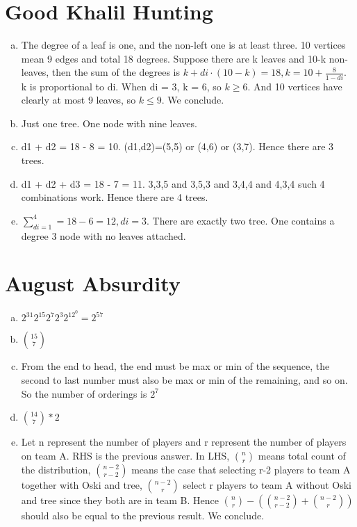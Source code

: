 \documentclass{article}
\begin{document}
\part*{Good Khalil Hunting}
\begin{enumerate}[(a)]
    \item The degree of a leaf is one, and the non-left one is at least three. 
    10 vertices mean 9 edges and total 18 degrees. Suppose there are k leaves and 10-k non-leaves, 
    then the sum of the degrees is $k + di \cdot (10 - k) = 18, k = 10 + \frac{8}{1-di}$. 
    k is proportional to di. When di = 3, k = 6, so $k \ge 6$. 
    And 10 vertices have clearly at most 9 leaves, so $k \le 9$. We conclude.
    \item Just one tree. One node with nine leaves.
    \item d1 + d2 = 18 - 8 = 10. (d1,d2)=(5,5) or (4,6) or (3,7). Hence there are 3 trees.
    \item d1 + d2 + d3 = 18 - 7 = 11. 3,3,5 and 3,5,3 and 3,4,4 and 4,3,4 such 4 combinations work. Hence there are 4 trees.
    \item $\sum_{di=1}^{4} = 18 - 6 = 12, di = 3$. There are exactly two tree. One contains a degree 3 node with no leaves attached.
    
\end{enumerate}

\part*{August Absurdity}
\begin{enumerate}[(a)]
    \item $2^{31}2^{15}2^{7}2^{3}2^12^0 = 2^57$
    \item $\binom{15}{7}$
    \item From the end to head, the end must be max or min of the sequence, the second to last number must also be max or min of the remaining, and so on. 
    So the number of orderings is $2^7$
    \item $\binom{14}{7} * 2$
    \item Let n represent the number of players and r represent the number of players on team A. 
    RHS is the previous answer. In LHS, $\binom{n}{r}$ means total count of the distribution, 
    $\binom{n-2}{r-2}$ means the case that selecting r-2 players to team A together with Oski and tree, 
    $\binom{n-2}{r}$ select r players to team A without Oski and tree since they both are in team B. 
    Hence $\binom{n}{r} - (\binom{n-2}{r-2} + \binom{n-2}{r})$ should also be equal to the previous result. 
    We conclude.
\end{enumerate}
\end{document}
